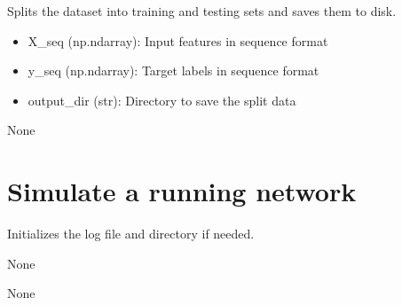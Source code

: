 \documentclass[letterpaper,10pt,english]{sphinxmanual}
\begin{document}
\begin{fulllineitems}
\label{\detokenize{lstm_preprocessing:lstm_preprocessing.split_and_save_data}}
\pysigstartsignatures
{}
\pysigstopsignatures
\sphinxAtStartPar
Splits the dataset into training and testing sets and saves them to disk.
\begin{description}
\begin{itemize}
\item {} 
\sphinxAtStartPar
X\_seq (np.ndarray): Input features in sequence format

\item {} 
\sphinxAtStartPar
y\_seq (np.ndarray): Target labels in sequence format

\item {} 
\sphinxAtStartPar
output\_dir (str): Directory to save the split data

\end{itemize}

\sphinxAtStartPar
None

\end{description}

\end{fulllineitems}


\sphinxstepscope


\chapter{Simulate a running network}
\label{\detokenize{running_network:module-running_network}}\label{\detokenize{running_network:simulate-a-running-network}}\label{\detokenize{running_network::doc}}

\begin{fulllineitems}
\label{\detokenize{running_network:running_network.init_log}}
\pysigstartsignatures
{}
\pysigstopsignatures
\sphinxAtStartPar
Initializes the log file and directory if needed.
\begin{description}
\sphinxAtStartPar
None

\sphinxAtStartPar
None

\end{description}

\end{fulllineitems}
\end{document}
